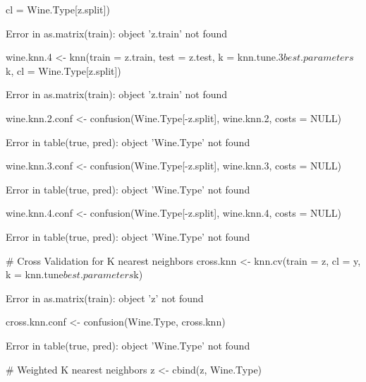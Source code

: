\documentclass[letterpaper]{article}\usepackage[]{graphicx}\usepackage[]{color}
\begin{document}
\begin{Schunk}
\begin{Sinput}
    cl = Wine.Type[z.split])
\end{Sinput}
\begin{Soutput}
Error in as.matrix(train): object 'z.train' not found
\end{Soutput}
\begin{Sinput}
wine.knn.4 <- knn(train = z.train, test = z.test, k = knn.tune.3$best.parameters$k, 
    cl = Wine.Type[z.split])
\end{Sinput}
\begin{Soutput}
Error in as.matrix(train): object 'z.train' not found
\end{Soutput}
\begin{Sinput}
wine.knn.2.conf <- confusion(Wine.Type[-z.split], wine.knn.2, costs = NULL)
\end{Sinput}
\begin{Soutput}
Error in table(true, pred): object 'Wine.Type' not found
\end{Soutput}
\begin{Sinput}
wine.knn.3.conf <- confusion(Wine.Type[-z.split], wine.knn.3, costs = NULL)
\end{Sinput}
\begin{Soutput}
Error in table(true, pred): object 'Wine.Type' not found
\end{Soutput}
\begin{Sinput}
wine.knn.4.conf <- confusion(Wine.Type[-z.split], wine.knn.4, costs = NULL)
\end{Sinput}
\begin{Soutput}
Error in table(true, pred): object 'Wine.Type' not found
\end{Soutput}
\begin{Sinput}
# Cross Validation for K nearest neighbors
cross.knn <- knn.cv(train = z, cl = y, k = knn.tune$best.parameters$k)
\end{Sinput}
\begin{Soutput}
Error in as.matrix(train): object 'z' not found
\end{Soutput}
\begin{Sinput}
cross.knn.conf <- confusion(Wine.Type, cross.knn)
\end{Sinput}
\begin{Soutput}
Error in table(true, pred): object 'Wine.Type' not found
\end{Soutput}
\begin{Sinput}
# Weighted K nearest neighbors
z <- cbind(z, Wine.Type)
\end{Sinput}
\begin{Soutput}

\end{Soutput}
\end{Schunk}
\end{document}
